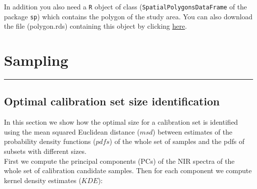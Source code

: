 \documentclass[]{book}
\begin{document}
In addition you also need a \texttt{R} object of class (\texttt{SpatialPolygonsDataFrame} of the package \texttt{sp}) which contains the polygon of the study area. You can also download the file (polygon.rds) containing this object by clicking \href{https://github.com/l-ramirez-lopez/VNIR_spectroscopy_for_robust_soil_mapping/raw/master/polygon.rds}{here}.

\hypertarget{sampling}{%
\chapter{Sampling}\label{sampling}}

\begin{center}\rule{0.5\linewidth}{\linethickness}\end{center}

\hypertarget{optimal-calibration-set-size-identification}{%
\section{Optimal calibration set size identification}\label{optimal-calibration-set-size-identification}}

In this section we show how the optimal size for a calibration set is identified using the mean squared
Euclidean distance (\(msd\)) between estimates of the probability density functions (\(pdfs\)) of the whole set of samples and the pdfs of subsets with different sizes.\\
First we compute the principal components (PCs) of the NIR spectra of the whole set of calibration candidate samples. Then for each component we compute kernel density estimates (\(KDE\)):
\end{document}
